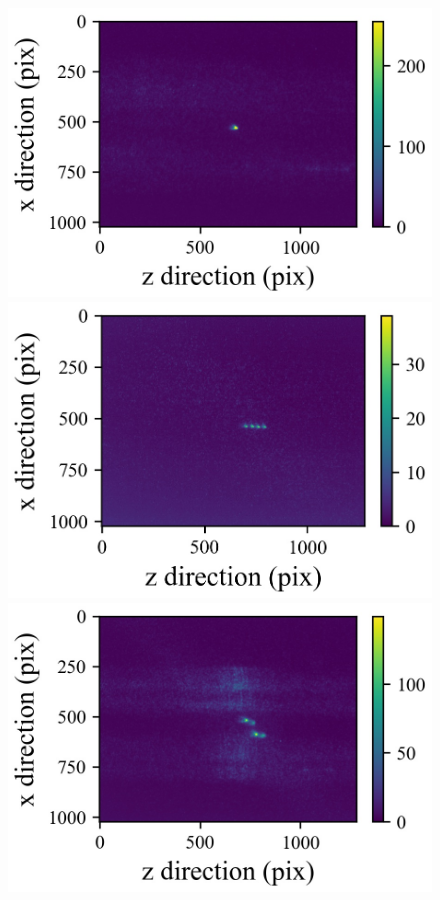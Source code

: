 \begin{figure}[h]
	\begin{center}
	\begin{minipage}{0.3\linewidth}
		\includegraphics[width=0.98\columnwidth]{./theory/figure/5/image_0.jpg}
	\end{minipage}
	\begin{minipage}{0.3\linewidth}
		\includegraphics[width=0.98\columnwidth]{./theory/figure/5/image_1.jpg}
	\end{minipage}
	\begin{minipage}{0.3\linewidth}
		\includegraphics[width=0.98\columnwidth]{./theory/figure/5/image_2.jpg}

\end{minipage}
\end{center}
\end{figure}
